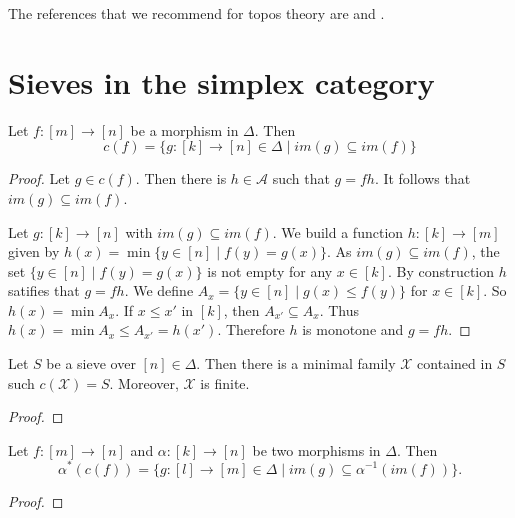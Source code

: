 The references that we recommend for topos theory are \cite{johnstone2014topos} and \cite{maclane2012sheaves}.

\section{Sieves in the simplex category}
\label{sec:2}

\begin{proposition}
Let $f\colon[m]\longrightarrow [n]$ be a morphism in $\Delta$. Then 
\[c(f)=\{g\colon [k]\longrightarrow [n]\in\Delta\mid im(g)\subseteq im(f)\}
\]
\end{proposition}

\begin{proof}
Let $g\in c(f)$. Then there is $h\in\mathcal{A}$ such that $g=fh$. It follows that $im(g)\subseteq im(f)$.

Let $g\colon [k]\longrightarrow[n]$ with $im(g)\subseteq im(f)$. We build a function $h\colon [k]\longrightarrow [m]$ given by $h(x)=\min\{y\in [n]\mid f(y)=g(x)\}$. As $im(g)\subseteq im(f)$, the set $\{y\in [n]\mid f(y)=g(x)\}$ is not empty for any $x\in [k]$. By construction $h$ satifies that $g=fh$. We define $A_x=\{y\in [n]\mid g(x)\leq f(y)\}$ for $x\in [k]$. So $h(x)=\min A_x$. If $x\leq x'$ in $[k]$, then $A_{x'}\subseteq A_x$. Thus $h(x)=\min A_x\leq A_{x'}=h(x')$. Therefore $h$ is monotone and $g=fh$.
\end{proof}

\begin{proposition}
Let $S$ be a sieve over $[n]\in\Delta$. Then there is a minimal family $\mathcal{X}$ contained in $S$ such $c(\mathcal{X})=S$. Moreover, $\mathcal{X}$ is finite.
\end{proposition}

\begin{proof}

\end{proof}

\begin{proposition}
Let $f\colon [m]\longrightarrow [n]$ and $\alpha\colon [k]\longrightarrow [n]$ be two morphisms in $\Delta$. Then
\[
\alpha^*(c(f))=\{g\colon [l]\longrightarrow[m]\in\Delta\mid im(g)\subseteq \alpha^{-1}(im(f))\}.
\]
\end{proposition}

\begin{proof}

\end{proof}

